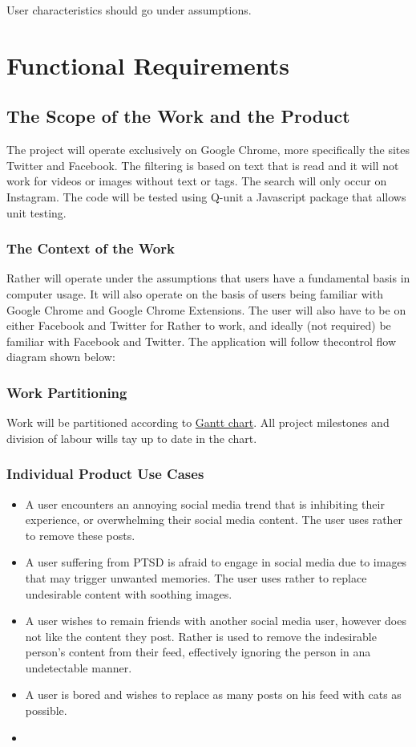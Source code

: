 \documentclass[12pt, titlepage]{article}
\begin{document}
User characteristics should go under assumptions.

\section{Functional Requirements}


\subsection{The Scope of the Work and the Product}
The project will operate exclusively on Google Chrome, more specifically the sites Twitter and Facebook. The filtering is based on text that is read and it will not work for videos or images without text or tags. The search will only occur on Instagram. The code will be tested using Q-unit a Javascript package that allows unit testing.

\subsubsection{The Context of the Work}
Rather will operate under the assumptions that users have a fundamental basis in computer usage. It will also operate on the basis of users being familiar with Google Chrome and Google Chrome Extensions. The user will also have to be on either Facebook and Twitter for Rather to work, and ideally (not required) be familiar with Facebook and Twitter. The application will follow thecontrol flow diagram shown below:


\subsubsection{Work Partitioning}
Work will be partitioned according to \href{../DevelopmentPlan/Dev_Plan_Rev0.gan}{Gantt chart}. All project milestones and division of labour wills tay up to date in the chart.

\subsubsection{Individual Product Use Cases}
\begin{itemize}
  \item A user encounters an annoying social media trend that is inhibiting their experience, or overwhelming their social media content. The user uses rather to remove these posts.
  \item A user suffering from PTSD is afraid to engage in social media due to images that may trigger unwanted memories. The user uses rather to replace undesirable content with soothing images.
  \item A user wishes to remain friends with another social media user, however does not like the content they post. Rather is used to remove the indesirable person's content from their feed, effectively ignoring the person in ana undetectable manner.
  \item A user is bored and wishes to replace as many posts on his feed with cats as possible.
  \item 
  
\end{itemize}
\end{document}
